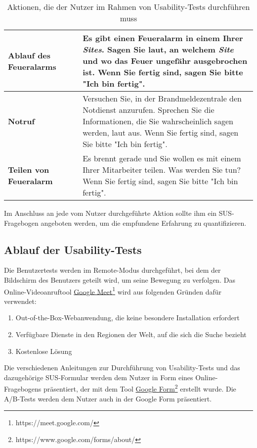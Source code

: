 \begin{table}[H]
\begin{tabular}{p{0.3\linewidth} |p{0.7\linewidth}}
    \textbf{Ablauf des Feueralarms}                   & Es gibt einen Feueralarm in einem Ihrer \textit{Sites}. Sagen Sie laut, an welchem \textit{Site} und wo das Feuer ungefähr ausgebrochen ist. Wenn Sie fertig sind, sagen Sie bitte "Ich bin fertig".                                                                                                              \\\hline
    \textbf{Notruf}                                   & Versuchen Sie, in der Brandmeldezentrale den Notdienst anzurufen. Sprechen Sie die Informationen, die Sie wahrscheinlich sagen werden, laut aus. Wenn Sie fertig sind, sagen Sie bitte "Ich bin fertig".                                                                                                          \\\hline
    \textbf{Teilen von Feueralarm}                    & Es brennt gerade und Sie wollen es mit einem Ihrer Mitarbeiter teilen. Was werden Sie tun? Wenn Sie fertig sind, sagen Sie bitte "Ich bin fertig".
  \end{tabular}
  \caption{Aktionen, die der Nutzer im Rahmen von Usability-Tests durchführen muss}
\end{table}

Im Anschluss an jede vom Nutzer durchgeführte Aktion sollte ihm ein \ac{SUS}-Fragebogen angeboten werden, um die empfundene Erfahrung zu quantifizieren.

\subsection{Ablauf der Usability-Tests} \label{sec:analyse_usability_tests}

Die Benutzertests werden im Remote-Modus durchgeführt, bei dem der Bildschirm des Benutzers geteilt wird, um seine Bewegung zu verfolgen.
Das Online-Videoanruftool \href{https://meet.google.com/}{Google Meet}\footnote{https://meet.google.com/} wird aus folgenden Gründen dafür verwendet:

\begin{enumerate}
  \item Out-of-the-Box-Webanwendung, die keine besondere Installation erfordert
  \item Verfügbare Dienste in den Regionen der Welt, auf die sich die Suche bezieht
  \item Kostenlose Lösung
\end{enumerate}

Die verschiedenen Anleitungen zur Durchführung von Usability-Tests und das dazugehörige \ac{SUS}-Formular werden dem Nutzer in Form eines Online-Fragebogens präsentiert, der mit dem Tool \href{https://www.google.com/forms/about/}{Google Form}\footnote{https://www.google.com/forms/about/}  erstellt wurde.
Die A/B-Tests werden dem Nutzer auch in der Google Form präsentiert.

